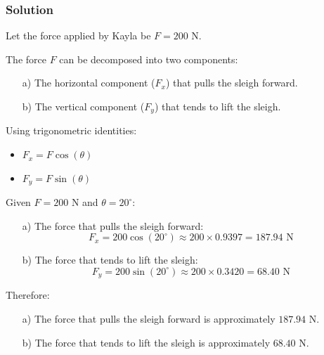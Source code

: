 \documentclass{article}
\begin{document}

\subsubsection*{Solution}

Let the force applied by Kayla be \( F = 200 \text{ N} \).

The force \( F \) can be decomposed into two components:
\begin{enumerate}
    \item[a)] The horizontal component (\( F_x \)) that pulls the sleigh forward.
    \item[b)] The vertical component (\( F_y \)) that tends to lift the sleigh.
\end{enumerate}

Using trigonometric identities:
\begin{itemize}
    \item \( F_x = F \cos(\theta) \)
    \item \( F_y = F \sin(\theta) \)
\end{itemize}

Given \( F = 200 \text{ N} \) and \( \theta = 20^\circ \):

\begin{enumerate}
    \item[a)] The force that pulls the sleigh forward:
    \[
    F_x = 200 \cos(20^\circ) \approx 200 \times 0.9397 = 187.94 \text{ N}
    \]
    \item[b)] The force that tends to lift the sleigh:
    \[
    F_y = 200 \sin(20^\circ) \approx 200 \times 0.3420 = 68.40 \text{ N}
    \]
\end{enumerate}

Therefore:
\begin{itemize}
    \item[a)] The force that pulls the sleigh forward is approximately \( 187.94 \text{ N} \).
    \item[b)] The force that tends to lift the sleigh is approximately \( 68.40 \text{ N} \).
\end{itemize}
\end{document}
